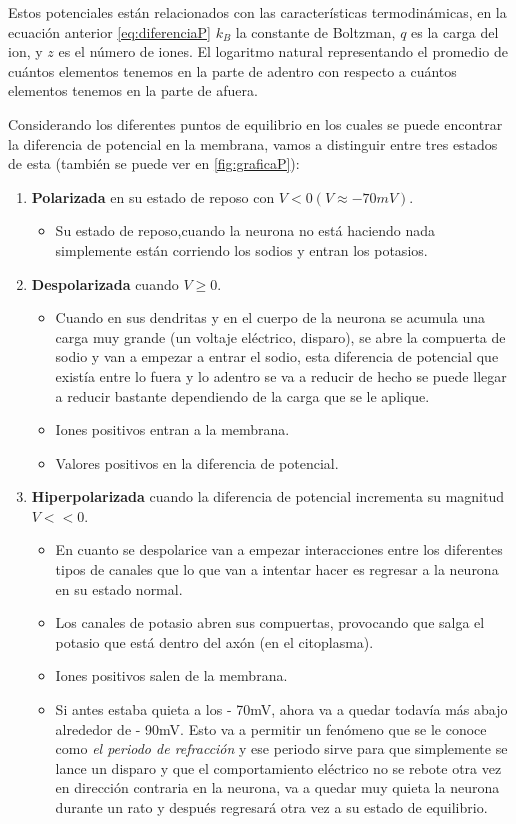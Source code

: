 Estos potenciales están relacionados con las características termodinámicas, en la ecuación anterior \ref{eq:diferenciaP} \(k_{B}\) la constante de Boltzman, \(q\) es la carga del ion, y \(z\) es el número de iones. El logaritmo natural representando el promedio de cuántos elementos tenemos en la parte de adentro con respecto a cuántos elementos tenemos en la parte de afuera.

Considerando los diferentes puntos de equilibrio en los cuales se puede encontrar la diferencia de potencial en la membrana, vamos a distinguir entre tres estados de esta (también se puede ver en \ref{fig:graficaP}):

\begin{enumerate}
 \item \textbf{Polarizada} en su estado de reposo con \(V < 0 ( V \approx -70 mV )\).
 \begin{itemize}
  \item Su estado de reposo,cuando la neurona no está haciendo nada simplemente están corriendo los sodios y entran los potasios.
 \end{itemize}
 \item \textbf{Despolarizada} cuando \(V \geq 0\).
 \begin{itemize}
  \item Cuando en sus dendritas y en el cuerpo de la neurona se acumula una carga muy grande (un voltaje eléctrico, disparo), se abre la compuerta de sodio y van a empezar a entrar el sodio, esta diferencia de potencial que existía entre lo fuera y lo adentro se va a reducir de hecho se puede llegar a reducir bastante dependiendo de la carga que se le aplique.
  \item Iones positivos entran a la membrana.
  \item Valores positivos en la diferencia de potencial.    
 \end{itemize}
 \item \textbf{Hiperpolarizada} cuando la diferencia de potencial incrementa su magnitud \(V << 0\).
 \begin{itemize}
 \item En cuanto se despolarice van a empezar interacciones entre los diferentes tipos de canales que lo que van a intentar hacer es regresar a la neurona en su estado normal.
 \item Los canales de potasio abren sus compuertas, provocando que salga el potasio que está dentro del axón (en el citoplasma). 
 \item Iones positivos salen de la membrana.
 \item Si antes estaba quieta a los - 70mV, ahora va a quedar todavía más abajo alrededor de - 90mV. Esto va a permitir un fenómeno que se le conoce como \emph{el periodo de refracción} y ese periodo sirve para que simplemente se lance un disparo y que el comportamiento eléctrico no se rebote otra vez en dirección contraria en la neurona, va a quedar muy quieta la neurona durante un rato y después regresará otra vez a su estado de equilibrio. 
 \end{itemize}

\end{enumerate}
 
